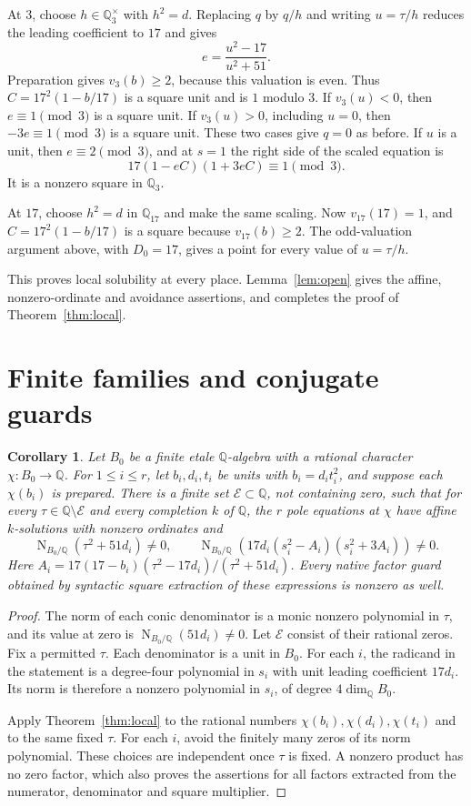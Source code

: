\documentclass[11pt,a4paper]{article}
\newtheorem{corollary}[theorem]{Corollary}
\theoremstyle{definition}\newtheorem{definition}[theorem]{Definition}
\newcommand{\Q}{\mathbb Q}\newcommand{\F}{\mathbb F}
\DeclareMathOperator{\Nm}{N}
\begin{document}
At $3$, choose $h\in\Q_3^\times$ with $h^2=d$. Replacing $q$ by
$q/h$ and writing $u=\tau/h$ reduces the leading coefficient to $17$
and gives
\[
                     e=\frac{u^2-17}{u^2+51}.
\]
Preparation gives $v_3(b)\ge2$, because this valuation is even. Thus
$C=17^2(1-b/17)$ is a square unit and is $1$ modulo $3$.
If $v_3(u)<0$, then $e\equiv1\pmod3$ is a square unit.
If $v_3(u)>0$, including $u=0$, then $-3e\equiv1\pmod3$ is a
square unit. These two cases give $q=0$ as before. If $u$ is a unit,
then $e\equiv2\pmod3$, and at $s=1$ the right side of the scaled
equation is
\[
                  17(1-eC)(1+3eC)\equiv1\pmod3.
\]
It is a nonzero square in $\Q_3$.

At $17$, choose $h^2=d$ in $\Q_{17}$ and make the same scaling.
Now $v_{17}(17)=1$, and $C=17^2(1-b/17)$ is a square because
$v_{17}(b)\ge2$. The odd-valuation argument above, with $D_0=17$,
gives a point for every value of $u=\tau/h$.

This proves local solubility at every place. Lemma~\ref{lem:open} gives
the affine, nonzero-ordinate and avoidance assertions, and completes the
proof of Theorem~\ref{thm:local}.

\section{Finite families and conjugate guards}

\begin{corollary}\label{cor:guards}
Let $B_0$ be a finite etale $\Q$-algebra with a rational character
$\chi:B_0\to\Q$. For $1\le i\le r$, let $b_i,d_i,t_i$ be units with
$b_i=d_it_i^2$, and suppose each $\chi(b_i)$ is prepared. There is a
finite set $\mathcal E\subset\Q$, not containing zero, such that for
every $\tau\in\Q\setminus\mathcal E$ and every completion $k$ of
$\Q$, the $r$ pole equations at $\chi$ have affine $k$-solutions with
nonzero ordinates and
\[
 \Nm_{B_0/\Q}(\tau^2+51d_i)\ne0,
 \qquad
 \Nm_{B_0/\Q}\!\left(
 17d_i(s_i^2-A_i)(s_i^2+3A_i)\right)\ne0.
\]
Here $A_i=17(17-b_i)(\tau^2-17d_i)/(\tau^2+51d_i)$.
Every native factor guard obtained by syntactic square extraction of these
expressions is nonzero as well.
\end{corollary}
\begin{proof}
The norm of each conic denominator is a monic nonzero polynomial in
$\tau$, and its value at zero is $\Nm_{B_0/\Q}(51d_i)\ne0$.
Let $\mathcal E$ consist of their rational zeros. Fix a permitted $\tau$.
Each denominator is a unit in $B_0$. For each $i$, the radicand in the
statement is a degree-four polynomial in $s_i$ with unit leading
coefficient $17d_i$. Its norm is therefore a nonzero polynomial in
$s_i$, of degree $4\dim_{\Q}B_0$.

Apply Theorem~\ref{thm:local} to the rational numbers
$\chi(b_i),\chi(d_i),\chi(t_i)$ and to the same fixed $\tau$.
For each $i$, avoid the finitely many zeros of its norm polynomial.
These choices are independent once $\tau$ is fixed. A nonzero product
has no zero factor, which also proves the assertions for all factors
extracted from the numerator, denominator and square multiplier.
\end{proof}
\end{document}
